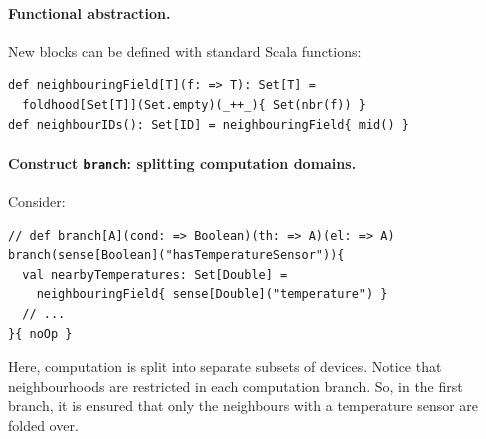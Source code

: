 \paragraph*{Functional abstraction.} New blocks can be defined with standard Scala functions:
\begin{lstlisting}
def neighbouringField[T](f: => T): Set[T] = 
  foldhood[Set[T]](Set.empty)(_++_){ Set(nbr(f)) }
def neighbourIDs(): Set[ID] = neighbouringField{ mid() }
\end{lstlisting}


\paragraph*{Construct \lstinline|branch|: splitting computation domains.} Consider: 
\begin{lstlisting}
// def branch[A](cond: => Boolean)(th: => A)(el: => A)
branch(sense[Boolean]("hasTemperatureSensor")){
  val nearbyTemperatures: Set[Double] = 
    neighbouringField{ sense[Double]("temperature") }
  // ...
}{ noOp }
\end{lstlisting}
%
Here, computation is split into separate subsets of devices. Notice that neighbourhoods are restricted in each computation branch. So, in the first branch, it is ensured that only the neighbours with a temperature sensor are folded over.

